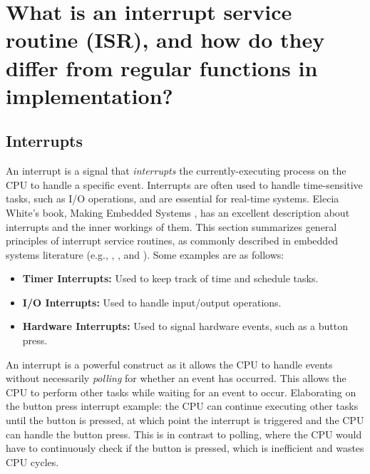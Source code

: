 \documentclass[main.tex]{subfiles}
\begin{document}
\section{What is an interrupt service routine (ISR), and how do they differ from regular functions in implementation?}

\spoilerline

\subsection{Interrupts}
An interrupt is a signal that \textit{interrupts} the currently-executing process on the CPU to handle a specific event. Interrupts are often used to handle time-sensitive tasks, such as I/O operations, and are essential for real-time systems. Elecia White's book, Making Embedded Systems \cite{white2024}, has an excellent description about interrupts and the inner workings of them. This section summarizes general principles of interrupt service routines, as commonly described in embedded systems literature (e.g., \cite{white2024}, \cite{myersInterrupts}, and \cite{BetterEmbeddedSystemSoftware}).
Some examples are as follows:
\begin{itemize}
    \item \textbf{Timer Interrupts:} Used to keep track of time and schedule tasks.
    \item \textbf{I/O Interrupts:} Used to handle input/output operations.
    \item \textbf{Hardware Interrupts:} Used to signal hardware events, such as a button press.
\end{itemize}
\noindent An interrupt is a powerful construct as it allows the CPU to handle events without necessarily \textit{polling} for whether an event has occurred. This allows the CPU to perform other tasks while waiting for an event to occur. \newline
\newline
\noindent Elaborating on the button press interrupt example: the CPU can continue executing other tasks until the button is pressed, at which point the interrupt is triggered and the CPU can handle the button press. This is in contrast to polling, where the CPU would have to continuously check if the button is pressed, which is inefficient and wastes CPU cycles.
\end{document}
